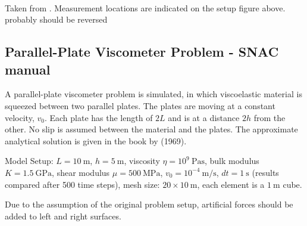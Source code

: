 \begin{center}
\\
{\captionfont Taken from \textcite{kubo77}. Measurement locations are indicated on 
the setup figure above. probably should be reversed}
\end{center}






\subsection{Parallel-Plate Viscometer Problem - SNAC manual \label{v-e-snac}}

A parallel-plate viscometer problem is simulated, in which viscoelastic material is squeezed between two
parallel plates. The plates are moving at a constant velocity, $v_0$. Each plate has the length of $2L$ and 
is at a distance $2h$ from the other. No slip is assumed between the material and the plates. The approximate
analytical solution is given in the book by \textcite{jaeg69} (1969).

Model Setup: $L = 10~\si{\meter}$, $h=5~\si{\meter}$, viscosity $\eta=10^9~\si{\pascal\second}$, 
bulk modulus $K= 1.5~\si{\giga\pascal}$, shear modulus $\mu = 500~\si{\mega\pascal}$,
$v_0 = 10^{-4}~\si{\meter\per\second}$, $dt = 1~\si{\second}$ (results compared after 500 time steps),
mesh size: $20\times 10~\si{\meter}$, each element is a $1~\si{\meter}$ cube.

Due to the assumption of the original problem setup, artificial forces should be added to left and right
surfaces.

